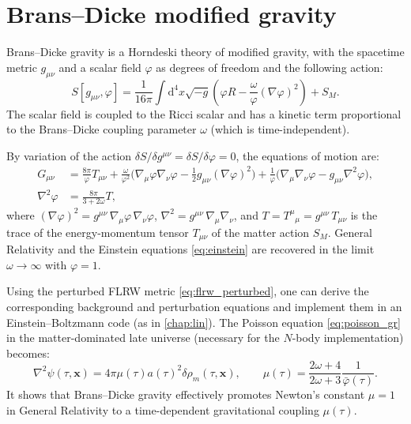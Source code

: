 \documentclass[USenglish, thumbmarks]{uiophdthesis} %
\newcommand\diff{\mathrm{d}}
\newcommand\EB{Einstein--Boltzmann}
\newcommand\GR{General Relativity}
\newcommand\BD{Brans--Dicke}
\begin{document}
\section{\BD{} modified gravity}
\label{sec:bransdicke}

\BD{} gravity is a Horndeski theory of modified gravity,
with the spacetime metric $g_{\mu\nu}$ and a scalar field $\varphi$ as degrees of freedom
and the following action:
\begin{equation}
S[g_{\mu\nu}, \varphi] = \frac{1}{16\pi} \int \diff^4 x \sqrt{-g} \left( \varphi R - \frac{\omega}{\varphi} (\nabla \varphi)^2 \right) + S_M .
\end{equation}
The scalar field is coupled to the Ricci scalar
and has a kinetic term proportional to the \BD{} coupling parameter $\omega$ (which is time-independent).

By variation of the action $\delta S/\delta g^{\mu\nu} =\delta S/\delta \varphi = 0$,
the equations of motion are:
\begin{subequations}
\label{eq:bd_eom}
\begin{align}
G_{\mu\nu} &= \frac{8\pi}{\varphi} T_{\mu\nu}
+ \frac{\omega}{\varphi^2} \Big( \nabla_\mu \varphi \nabla_\nu \varphi - \frac12 g_{\mu\nu} (\nabla \varphi)^2 \Big)
+ \frac{1}{\varphi} \Big( \nabla_\mu \nabla_\nu \varphi - g_{\mu\nu} \nabla^2 \varphi \Big) , \label{eq:bd_eom1} \\
\nabla^2 \varphi &= \frac{8\pi}{3+2\omega} T , \label{eq:bd_eom2}
\end{align}
\end{subequations}
where $(\nabla \varphi)^2 = g^{\mu\nu} \, \nabla_\mu \varphi \, \nabla_\nu \varphi$,
$\nabla^2 = g^{\mu\nu} \, \nabla_\mu \nabla_\nu$,
and $T = T^\mu{}_\mu =g^{\mu\nu} \, T_{\mu\nu}$
is the trace of the energy-momentum tensor $T_{\mu\nu}$ of the matter action $S_M$.
\GR{} and the Einstein equations \eqref{eq:einstein} are recovered in the limit $\omega \rightarrow \infty$ with $\varphi = 1$.

Using the perturbed FLRW metric \eqref{eq:flrw_perturbed},
one can derive the corresponding background and perturbation equations and implement them in an \EB{} code (as in \cref{chap:lin}).
The Poisson equation \eqref{eq:poisson_gr} in the matter-dominated late universe (necessary for the $N$-body implementation) becomes:
\begin{equation}
\nabla^2 \psi(\tau, \mathbf{x}) = 4\pi \mu(\tau) a(\tau)^2 \delta\rho_m(\tau,\mathbf{x}),
\qquad
\mu(\tau) = \frac{2\omega+4}{2\omega+3} \frac{1}{\bar\varphi(\tau)} .
\label{eq:poisson_bd}
\end{equation}
It shows that \BD{} gravity effectively promotes Newton's constant $\mu=1$ in \GR{}
to a time-dependent gravitational coupling $\mu(\tau)$.
\end{document}
